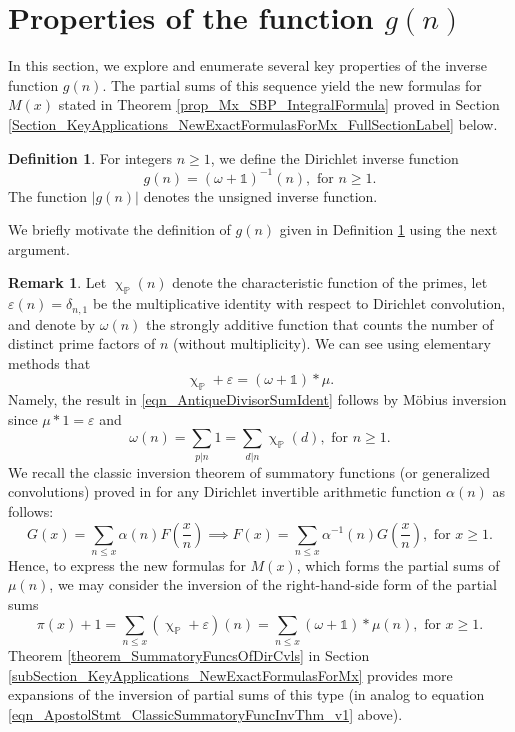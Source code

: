 \documentclass[11pt,reqno,a4letter]{article}
\newcommand{\hlocalref}[1]{\hyperref[#1]{\ref{#1}}}
\numberwithin{equation}{section}
\numberwithin{figure}{section}
\numberwithin{table}{section}
\renewcommand{\chi}{\upchi}
\theoremstyle{plain}
\numberwithin{theorem}{section}
\theoremstyle{definition}
\newtheorem{remark}[theorem]{Remark}
\newtheorem{definition}[theorem]{Definition}
\begin{document}
\section{Properties of the function $g(n)$} 
\label{Section_NewFormulasForgInvn_v2} 

In this section, we explore and enumerate several key properties of the inverse function 
$g(n)$. The partial sums of this sequence yield the new formulas for $M(x)$ stated in 
Theorem \hlocalref{prop_Mx_SBP_IntegralFormula} proved in 
Section \hlocalref{Section_KeyApplications_NewExactFormulasForMx_FullSectionLabel} below. 

\begin{definition}
\label{def_gn_and_Absgn_v2} 
For integers $n \geq 1$, we define the Dirichlet inverse function 
\[
g(n) = (\omega + \mathds{1})^{-1}(n), \text{ for } n \geq 1. 
\]
The function $|g(n)|$ denotes the unsigned inverse function. 
\end{definition}

We briefly motivate the definition of $g(n)$ given in 
Definition \hlocalref{def_gn_and_Absgn_v2} using the next argument.

\begin{remark} 
Let $\chi_{\mathbb{P}}(n)$ denote the characteristic function of the primes, let 
$\varepsilon(n) = \delta_{n,1}$ be the multiplicative identity 
with respect to Dirichlet convolution, 
and denote by $\omega(n)$ the strongly additive function that counts the number of 
distinct prime factors of $n$ (without multiplicity). 
We can see using elementary methods that 
\begin{equation}
\label{eqn_AntiqueDivisorSumIdent} 
\chi_{\mathbb{P}} + \varepsilon = (\omega + \mathds{1}) \ast \mu. 
\end{equation} 
Namely, the result in \eqref{eqn_AntiqueDivisorSumIdent} follows by M\"obius inversion 
since $\mu \ast 1 = \varepsilon$ and 
\[
\omega(n) = \sum_{p|n} 1 = \sum_{d|n} \chi_{\mathbb{P}}(d), \text{ for } n \geq 1. 
\]
We recall the classic inversion theorem of summatory functions 
(or generalized convolutions) proved in 
\cite[\S 2.14]{APOSTOLANUMT} for any Dirichlet invertible arithmetic 
function $\alpha(n)$ as follows: 
\begin{equation}
\label{eqn_ApostolStmt_ClassicSummatoryFuncInvThm_v1} 
G(x) = \sum_{n \leq x} \alpha(n) F\left(\frac{x}{n}\right) \implies 
     F(x) = \sum_{n \leq x} \alpha^{-1}(n) G\left(\frac{x}{n}\right), 
     \text{ for } x \geq 1. 
\end{equation}
Hence, to express the new formulas for $M(x)$, which forms the partial sums of $\mu(n)$, 
we may consider the inversion of the right-hand-side form of the partial sums 
\[
\pi(x) + 1 = \sum_{n \leq x} \left(\chi_{\mathbb{P}} + \varepsilon\right)(n) = 
	\sum_{n \leq x} (\omega + \mathds{1}) \ast \mu(n), 
	\text{ for } x \geq 1. 
\]
Theorem \hlocalref{theorem_SummatoryFuncsOfDirCvls} in 
Section \hlocalref{subSection_KeyApplications_NewExactFormulasForMx} 
provides more expansions of the inversion of partial sums of this type 
(in analog to equation \eqref{eqn_ApostolStmt_ClassicSummatoryFuncInvThm_v1} above). 
\end{remark}
\end{document}
